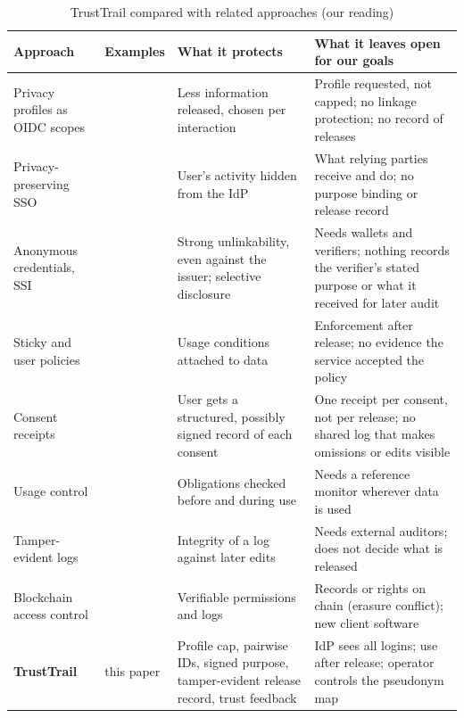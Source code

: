 \begin{table}[t]
\centering
\caption{TrustTrail compared with related approaches (our reading)}
\label{tab:related}
\small
\begin{tabularx}{\linewidth}{@{}>{\raggedright\arraybackslash}p{3.0cm} >{\raggedright\arraybackslash}p{2.6cm} >{\raggedright\arraybackslash}X >{\raggedright\arraybackslash}X@{}}
\toprule
Approach & Examples & What it protects & What it leaves open for our goals \\
\midrule
Privacy profiles as OIDC scopes & \cite{werner2015approach,werner2016model} & Less information released, chosen per interaction & Profile requested, not capped; no linkage protection; no record of releases \\
Privacy-preserving SSO & \cite{fett2015spresso,hammann2020privacy,guo2021uppresso} & User's activity hidden from the IdP & What relying parties receive and do; no purpose binding or release record \\
Anonymous credentials, SSI & \cite{camenisch2002idemix,paquin2013uprove,w3cvc2} & Strong unlinkability, even against the issuer; selective disclosure & Needs wallets and verifiers; nothing records the verifier's stated purpose or what it received for later audit \\
Sticky and user policies & \cite{pearson2011sticky,chadwick2012privacy,orawiwattanakul2010user} & Usage conditions attached to data & Enforcement after release; no evidence the service accepted the policy \\
Consent receipts & \cite{kantarareceipt} & User gets a structured, possibly signed record of each consent & One receipt per consent, not per release; no shared log that makes omissions or edits visible \\
Usage control & \cite{park2004ucon} & Obligations checked before and during use & Needs a reference monitor wherever data is used \\
Tamper-evident logs & \cite{schneier1999secure,crosby2009efficient,laurie2014certificate} & Integrity of a log against later edits & Needs external auditors; does not decide what is released \\
Blockchain access control & \cite{zyskind2015decentralizing,azaria2016medrec,truong2020gdpr} & Verifiable permissions and logs & Records or rights on chain (erasure conflict); new client software \\
\textbf{TrustTrail} & this paper & Profile cap, pairwise IDs, signed purpose, tamper-evident release record, trust feedback & IdP sees all logins; use after release; operator controls the pseudonym map \\
\bottomrule
\end{tabularx}
\end{table}
